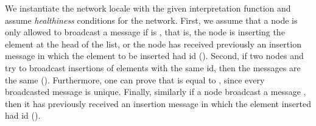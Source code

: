 \documentclass[acmlarge,review,anonymous]{acmart}\settopmatter{printfolios=true}
\begin{document}
We instantiate the network locale with the given interpretation function and
assume \emph{healthiness} conditions for the network. First, we assume that a
node is only allowed to broadcast a message  if  is
, that is, the node is inserting the element at the head of the list,
or the node has received previously an insertion message in which the element
to be inserted had id  (). Second, if two nodes
 and  try to broadcast insertions of elements with the same id,
then the messages are the same (). Furthermore, one can
prove that  is equal to , since every broadcasted message is
unique. Finally, similarly if a node broadcast a message , then
it has previously received an insertion message in which the element inserted
had id  ().
\end{document}
